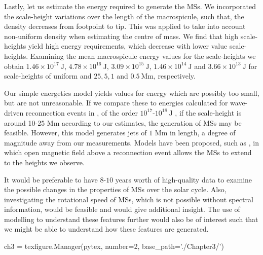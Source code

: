 Lastly, let us estimate the energy required to generate the MSs. We incorporated the scale-height variations over the length of the macrospicule, such that, the density decreases from footpoint to tip. This was applied to take into account non-uniform density when estimating the centre of mass. We find that high scale-heights yield high energy requirements, which decrease with lower value scale-heights. Examining the mean macrospicule energy values for the scale-heights we obtain $1.46 \times 10^{17}\ \textrm{J}$, $4.78 \times 10^{16}\ \textrm{J}$,  $3.09 \times 10^{15}\ \textrm{J}$, $1.46 \times 10^{14}\ \textrm{J}$ and $3.66 \times 10^{13}\ \textrm{J}$ for scale-heights of uniform and $25, 5, 1$ and $0.5\ \textrm{Mm}$, respectively.

Our simple energetics model yields values for energy which are possibly too small, but are not unreasonable. If we compare these to energies calculated for wave-driven reconnection events in \cite{Heggland2009}, of the order $10^{17}$-$10^{18}\ \textrm{J}$ , if the scale-height is around 10-25 Mm according to our estimates, the generation of MSs may be feasible. However, this model generates jets of $1$ Mm in length, a degree of magnitude away from our measurements. Models have been proposed, such as \cite{Adams2014}, in which open magnetic field above a reconnection event allows the MSs to extend to the heights we observe.

It would be preferable to have $8$-$10$ years worth of high-quality data to examine the possible changes in the properties of MSs over the solar cycle. Also, investigating the rotational speed of MSs, which is not possible without spectral information, would be feasible and would give additional insight. The use of modelling to understand these features further would also be of interest such that we might be able to understand how these features are generated.  



\begin{pycode}[chapter3]
ch3 = texfigure.Manager(pytex, number=2, base_path='./Chapter3/')
\end{pycode}
